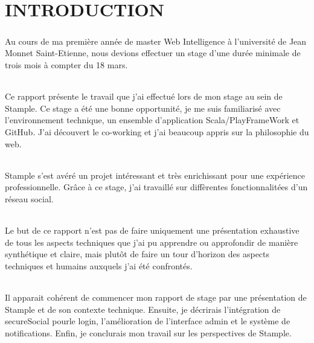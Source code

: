 \chapter{INTRODUCTION}
\paragraph{}
Au cours de ma première année de master Web Intelligence à l'université de Jean Monnet Saint-Etienne, nous devions effectuer un stage d'une durée minimale de trois mois à compter du 18 mars.
\subparagraph{}
Ce rapport présente le travail que j'ai effectué lors de mon stage au sein de Stample.
\newline
Ce stage a été une bonne opportunité, je me suis familiarisé avec l'environnement technique, un ensemble d'application Scala/PlayFrameWork et GitHub.
J'ai découvert le co-working et j'ai beaucoup appris sur la philosophie du web.
\subparagraph{}
Stample s'est avéré un projet intéressant et très enrichissant pour une expérience professionnelle. Gr\^ace à ce stage, j'ai travaillé sur diffèrentes fonctionnalitées d'un réseau social.
\subparagraph{}
Le but de ce rapport n’est pas de faire uniquement une présentation exhaustive de tous les aspects techniques que j’ai pu apprendre ou approfondir de manière synthétique et claire, mais plutôt de faire un tour d’horizon des aspects techniques et humains auxquels j’ai été confrontés.
\subparagraph{}
Il apparait cohérent de commencer mon rapport de stage par une présentation de Stample et de son contexte technique. Ensuite, je décrirais l'intégration de secureSocial pourle login, l'amélioration de l'interface admin  et le système de notifications. Enfin, je conclurais  mon travail sur les perspectives de Stample.